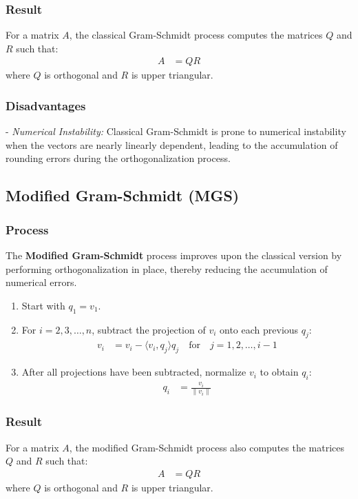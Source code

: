 \documentclass[article]{IEEEtran}
\numberwithin{equation}{enumi}
\numberwithin{figure}{enumi}
\begin{document}
\subsubsection{Result}
For a matrix $ A $, the classical Gram-Schmidt process computes the matrices $ Q $ and $ R $ such that:
\begin{align*}
A &= QR
\end{align*}
where $ Q $ is orthogonal and $ R $ is upper triangular.

\subsubsection{Disadvantages}
- \textit{Numerical Instability:} Classical Gram-Schmidt is prone to numerical instability when the vectors are nearly linearly dependent, leading to the accumulation of rounding errors during the orthogonalization process.

\subsection{Modified Gram-Schmidt (MGS)}

\subsubsection{Process}
The \textbf{Modified Gram-Schmidt} process improves upon the classical version by performing orthogonalization in place, thereby reducing the accumulation of numerical errors.

\begin{enumerate}
    \item Start with $ q_1 = v_1 $.
    \item For $ i = 2, 3, \dots, n $, subtract the projection of $ v_i $ onto each previous $ q_j $:
    \begin{align*}
    v_i &= v_i - \langle v_i, q_j \rangle q_j \quad \text{for} \quad j = 1, 2, \dots, i-1
    \end{align*}
    \item After all projections have been subtracted, normalize $ v_i $ to obtain $ q_i $:
    \begin{align*}
    q_i &= \frac{v_i}{\|v_i\|}
    \end{align*}
\end{enumerate}

\subsubsection{Result}
For a matrix $ A $, the modified Gram-Schmidt process also computes the matrices $ Q $ and $ R $ such that:
\begin{align*}
A &= QR
\end{align*}
where $ Q $ is orthogonal and $ R $ is upper triangular.
\end{document}

